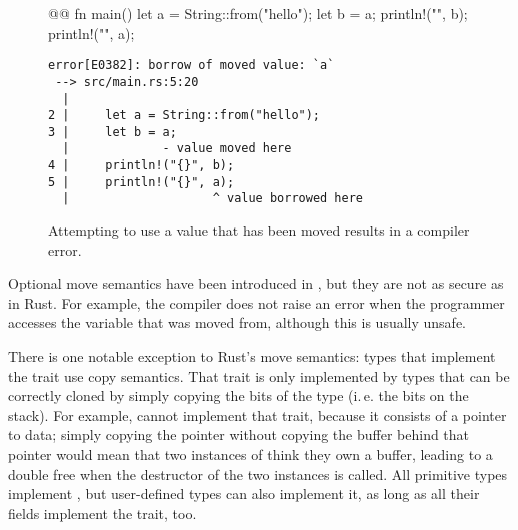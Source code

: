 {{\begin{figure}[b]
  \centering
  \begin{minipage}[t]{.5\textwidth}
    \begin{rustcode}
      @@
      fn main() {
          let a = String::from("hello");
          let b = a;
          println!("{}", b);
          println!("{}", a);
      }
    \end{rustcode}
  \end{minipage}
  \hspace{2mm}
  \begin{minipage}[t]{.47\textwidth}
    \footnotesize
    \vspace{3mm}
    \begin{verbatim}
error[E0382]: borrow of moved value: `a`
 --> src/main.rs:5:20
  |
2 |     let a = String::from("hello");
3 |     let b = a;
  |             - value moved here
4 |     println!("{}", b);
5 |     println!("{}", a);
  |                    ^ value borrowed here
    \end{verbatim}
  \end{minipage}
  \caption{Attempting to use a value that has been moved results in a compiler error.}
  \label{fig:string-move}
\end{figure}

Optional move semantics have been introduced in \cppeleven, but they are not as secure as in Rust.
For example, the \cpp compiler does not raise an error when the programmer accesses the variable that was moved from, although this is usually unsafe.

There is one notable exception to Rust's move semantics: types that implement the trait  use copy semantics.
That trait is only implemented by types that can be correctly cloned by simply copying the bits of the type (i.\,e. the bits on the stack).
For example,  cannot implement that trait, because it consists of a pointer to data; simply copying the pointer without copying the buffer behind that pointer would mean that two instances of  think they own a buffer, leading to a double free when the destructor of the two instances is called.
All primitive types implement , but user-defined types can also implement it, as long as all their fields implement the trait, too.

}}
